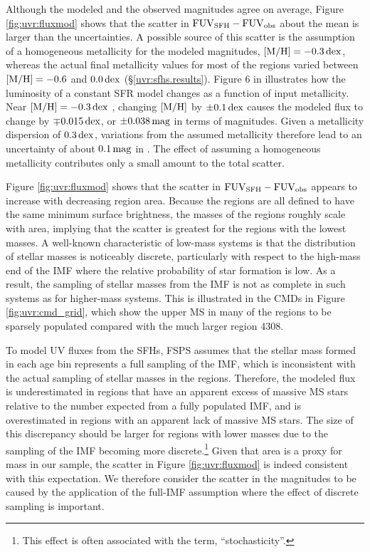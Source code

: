 Although the modeled and the observed \fuv{} magnitudes agree on average, Figure
\ref{fig:uvr:fluxmod} shows that the scatter in $\mathrm{FUV}_{\mathrm{SFH}} - \mathrm{FUV}_{\mathrm{obs}}$
about the mean is larger than the uncertainties. A possible source of this
scatter is the assumption of a homogeneous metallicity for the modeled \fuv{}
magnitudes, $\mathrm{[M/H]} = -0.3\,\mathrm{dex}$, whereas the actual final
metallicity values for most of the regions varied between $\mathrm{[M/H]} =
-0.6$ and $0.0\,\mathrm{dex}$ (\S \ref{uvr:sfhs.results}). Figure 6 in
\citet{Johnson:2013} illustrates how the \fuv{} luminosity of a constant SFR model
changes as a function of input metallicity. Near $\mathrm{[M/H]} =
-0.3\,\mathrm{dex}$ \citep[$\logten(Z/Z_\odot) \approx -0.3$, assuming the
helium-to-metals enrichment law from][]{Bressan:2012}, changing $\mathrm{[M/H]}$
by $\pm 0.1\,\mathrm{dex}$ causes the modeled \fuv{} flux to change by $\mp
0.015\,\mathrm{dex}$, or $\pm 0.038\,\mathrm{mag}$ in terms of \fuv{} magnitudes.
Given a metallicity dispersion of $0.3\,\mathrm{dex}$, variations from the
assumed metallicity therefore lead to an uncertainty of about
$0.1\,\mathrm{mag}$ in \fuvsfh{}. The effect of assuming a
homogeneous metallicity contributes only a small amount to the total scatter.

Figure \ref{fig:uvr:fluxmod} shows that the scatter in $\mathrm{FUV}_{\mathrm{SFH}} -
\mathrm{FUV}_{\mathrm{obs}}$ appears to increase with decreasing region area. Because the
regions are all defined to have the same minimum \fuv{} surface brightness, the
masses of the regions roughly scale with area, implying that the scatter is
greatest for the regions with the lowest masses. A well-known characteristic of
low-mass systems is that the distribution of stellar masses is noticeably
discrete, particularly with respect to the high-mass end of the IMF where the
relative probability of star formation is low. As a result, the sampling of
stellar masses from the IMF is not as complete in such systems as for
higher-mass systems. This is illustrated in the CMDs in Figure
\ref{fig:uvr:cmd_grid}, which show the upper MS in many of the regions to be
sparsely populated compared with the much larger region 4308.

To model UV fluxes from the SFHs, FSPS assumes that the stellar mass formed in
each age bin represents a full sampling of the IMF, which is inconsistent with
the actual sampling of stellar masses in the regions. Therefore, the modeled
flux is underestimated in regions that have an apparent excess of massive MS
stars relative to the number expected from a fully populated IMF, and is
overestimated in regions with an apparent lack of massive MS stars. The size of
this discrepancy should be larger for regions with lower masses due to the
sampling of the IMF becoming more discrete.\footnote{This effect is often
associated with the term, ``stochasticity''.} Given that area is a proxy for
mass in our sample, the scatter in Figure \ref{fig:uvr:fluxmod} is indeed
consistent with this expectation. We therefore consider the scatter in the
magnitudes to be caused by the application of the full-IMF assumption where the
effect of discrete sampling is important.

